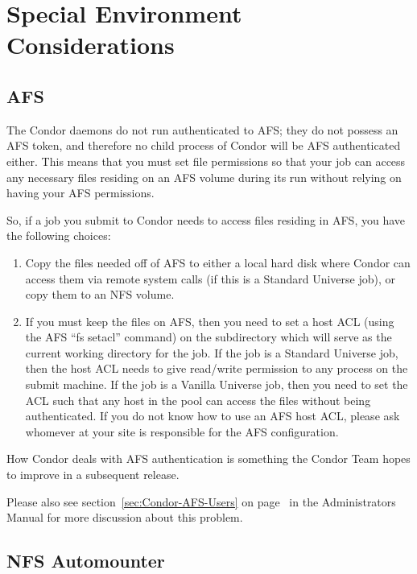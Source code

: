 \section{Special Environment Considerations}

\subsection{AFS}

The Condor daemons do not run authenticated to AFS; they do not possess
an AFS token, and therefore no child process of Condor will be AFS
authenticated either. This means that you must set file permissions so
that your job can access any necessary files residing on an AFS volume
during its run without relying on having your AFS permissions.

So, if a job you submit to Condor needs to access files residing in AFS,
you have the following choices:
\begin{enumerate}
\item Copy the files needed off of AFS to either a local hard disk where Condor 
can access them via remote system calls (if
this is a Standard Universe job), or copy them to an NFS volume.
\item If you must keep the files on AFS, then you need to set a host ACL
(using the AFS ``fs setacl'' command) on the subdirectory which will
serve as the current working directory for the job.  If the job is a
Standard Universe job, then the host ACL needs to give read/write permission
to any process on the submit machine.  If the job is a Vanilla Universe
job, then you need to set the ACL such that any host in the pool can
access the files without being authenticated.  If you do not know how to
use an AFS host ACL, please ask whomever at your site is responsible for the
AFS configuration.
\end{enumerate}

How Condor deals with AFS authentication is something the Condor Team
hopes to improve in a subsequent release.

Please also see section~\ref{sec:Condor-AFS-Users} on
page~\pageref{sec:Condor-AFS-Users} in the Administrators Manual for
more discussion about this problem.

\subsection{NFS Automounter}

